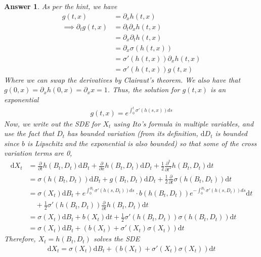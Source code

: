 \documentclass[12pt]{article}
\theoremstyle{colon}
\newtheorem*{answer}{Answer}
\begin{document}
\begin{answer}
  As per the hint, we have
  \begin{align*}
    g(t,x) &= \partial_x h(t,x) \\
    \implies \partial_t g(t,x) &= \partial_t \partial_x h(t,x) \\
    &= \partial_x \partial_t h(t,x) \\
    &= \partial_x \sigma(h(t,x)) \\
    &= \sigma'(h(t,x)) \partial_x h(t,x) \\
    &= \sigma'(h(t,x)) g(t,x)
  \end{align*}
  Where we can swap the derivatives by Clairaut's theorem. We also have that $g(0,x) = \partial_x h(0,x) = \partial_x x = 1$. Thus, the solution for $g(t,x)$ is an exponential
  \begin{gather*}
    g(t,x) = e^{\int_0^t \sigma'(h(s,x)) ds}
  \end{gather*}
  Now, we write out the SDE for $X_t$ using Ito's formula in multiple variables, and use the fact that $D_t$ has bounded variation (from its definition, $\text{d} D_t$ is bounded since $b$ is Lipschitz and the exponential is also bounded) so that some of the cross variation terms are 0,
  \begin{align*}
    \text{d} X_t &= \frac{\partial}{\partial t} h(B_t,D_t) \text{d} B_t  + \frac{\partial}{\partial x} h(B_t,D_t) \text{d} D_t + \frac{1}{2} \frac{\partial^2}{\partial t^2} h(B_t,D_t) \text{d} t \\
    &= \sigma(h(B_t,D_t)) \text{d} B_t + g(B_t,D_t) \text{d} D_t + \frac{1}{2} \frac{\partial}{\partial t} \sigma(h(B_t,D_t)) \text{d} t\\
    &= \sigma(X_t) \text{d} B_t + e^{\int_0^{B_t} \sigma'(h(s,D_t)) ds} \cdot b(h(B_t, D_t)) e^{-\int_0^{B_t} \sigma'(h(s,D_t)) ds} \text{d} t \\
    &\quad + \frac{1}{2} \sigma'(h(B_t,D_t)) \frac{\partial}{\partial t} h(B_t, D_t) \text{d} t \\
    &= \sigma(X_t) \text{d} B_t + b(X_t) \text{d} t + \frac{1}{2} \sigma'(h(B_t,D_t)) \sigma(h(B_t,D_t)) \text{d} t \\
    &= \sigma(X_t) \text{d} B_t + (b(X_t) + \sigma'(X_t) \sigma(X_t)) \text{d} t
  \end{align*}
  Therefore, $X_t = h(B_t, D_t)$ solves the SDE
  \begin{gather*}
    \text{d} X_t = \sigma(X_t) \text{d} B_t + (b(X_t) + \sigma'(X_t) \sigma(X_t)) \text{d} t \\

\end{gather*}
\end{answer}
\end{document}
